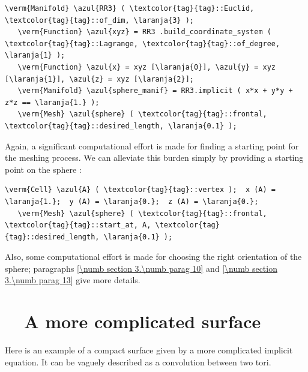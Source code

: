 \begin{Verbatim}[commandchars=\\\{\},formatcom=\small\tt,frame=single,
   label=parag-\ref{\numb section 3.\numb parag 6}.cpp,rulecolor=\color{moldura},
   baselinestretch=0.94,framesep=2mm                                            ]
   \verm{Manifold} \azul{RR3} ( \textcolor{tag}{tag}::Euclid, \textcolor{tag}{tag}::of_dim, \laranja{3} );
   \verm{Function} \azul{xyz} = RR3 .build_coordinate_system ( \textcolor{tag}{tag}::Lagrange, \textcolor{tag}{tag}::of_degree, \laranja{1} );
   \verm{Function} \azul{x} = xyz [\laranja{0}], \azul{y} = xyz [\laranja{1}], \azul{z} = xyz [\laranja{2}];
   \verm{Manifold} \azul{sphere_manif} = RR3.implicit ( x*x + y*y + z*z == \laranja{1.} );
   \verm{Mesh} \azul{sphere} ( \textcolor{tag}{tag}::frontal, \textcolor{tag}{tag}::desired_length, \laranja{0.1} );
\end{Verbatim}

Again, a significant computational effort is made for finding a starting point
for the meshing process.
We can alleviate this burden simply by providing a starting point on the sphere :

\begin{Verbatim}[commandchars=\\\{\},formatcom=\small\tt,
   baselinestretch=0.94,framesep=2mm                     ]
   \verm{Cell} \azul{A} ( \textcolor{tag}{tag}::vertex );  x (A) = \laranja{1.};  y (A) = \laranja{0.};  z (A) = \laranja{0.};
   \verm{Mesh} \azul{sphere} ( \textcolor{tag}{tag}::frontal, \textcolor{tag}{tag}::start_at, A, \textcolor{tag}{tag}::desired_length, \laranja{0.1} );
\end{Verbatim}

Also, some computational effort is made for choosing the right orientation of the sphere;
paragraphs \ref{\numb section 3.\numb parag 10} and \ref{\numb section 3.\numb parag 13}
give more details.


\section{~~A more complicated surface}\label{\numb section 3.\numb parag 7}

Here is an example of a compact surface given by a more complicated implicit equation.
It can be vaguely described as a convolution between two tori.

